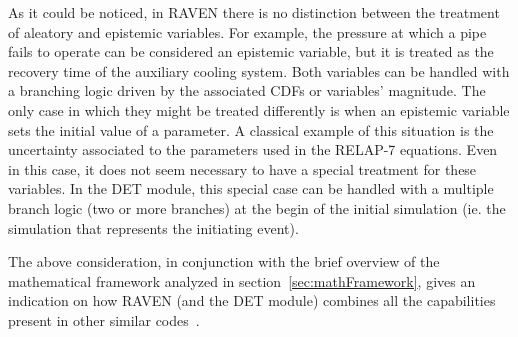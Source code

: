 As it could be noticed, in RAVEN there is no distinction between the treatment of aleatory and epistemic variables. For example, the pressure at which a pipe fails to operate can be considered an epistemic variable, but it is treated as the recovery time of the auxiliary cooling system. Both variables can be handled with a branching logic driven by the associated CDFs or variables’ magnitude. The only case in which they might be treated differently is when an epistemic variable sets the initial value of a parameter. A classical example of this situation is the uncertainty associated to the parameters used in the RELAP-7 equations. Even in this case, it does not seem necessary to have a special treatment for these variables. In the DET module, this special case can be handled  with a multiple branch logic (two or more branches) at the begin of the initial simulation (ie. the simulation that represents the initiating event).

The above consideration, in conjunction with the brief overview of the mathematical framework analyzed in section~\ref{sec:mathFramework}, gives an indication on how RAVEN (and the DET module) combines all the capabilities present in other similar codes~\cite{ADAPTHakobyan}.  

